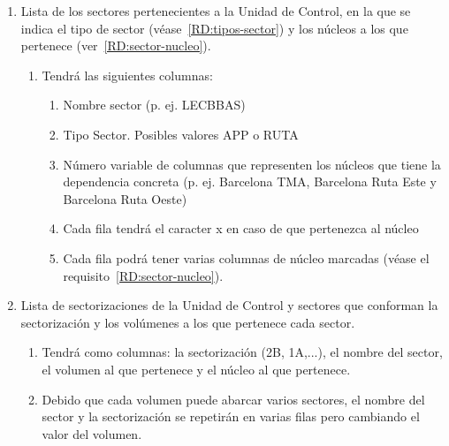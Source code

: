 \begin{enumerate}[label={\textbf{RIO\arabic*}}, ref={RIO\arabic*},  align=left]
\begin{enumerate}[label*={\textbf{.\arabic*}}]
		\item Lista de los sectores pertenecientes a la Unidad de Control, en la que se indica el tipo de sector (véase~\ref{RD:tipos-sector}) y los núcleos a los que pertenece (ver~\ref{RD:sector-nucleo}).
		\begin{enumerate}[label*={\textbf{.\arabic*}}]
			\item Tendrá las siguientes columnas: 
			\begin{enumerate}[label*={\textbf{.\arabic*}}]
				\item Nombre sector (p. ej. LECBBAS) 
				\item Tipo Sector. Posibles valores APP o RUTA
				\item Número variable de columnas que representen los núcleos que tiene la dependencia concreta (p. ej. Barcelona TMA, Barcelona Ruta Este y Barcelona Ruta Oeste)
				\item Cada fila tendrá el caracter x en caso de que pertenezca al núcleo
				\item Cada fila podrá tener varias columnas de núcleo marcadas (véase el requisito~\ref{RD:sector-nucleo}).
			\end{enumerate}
		\end{enumerate}
		\item Lista de sectorizaciones de la Unidad de Control y sectores que conforman la sectorización y los volúmenes a los que pertenece cada sector.
		\begin{enumerate}[label*={\textbf{.\arabic*}}]
			\item Tendrá como columnas: la sectorización (2B, 1A,...), el nombre del sector, el volumen al que pertenece y el núcleo al que pertenece.
			\item Debido que cada volumen puede abarcar varios sectores, el nombre del sector y la sectorización se repetirán en varias filas pero cambiando el valor del volumen.
		\end{enumerate}
	\end{enumerate}
	

\end{enumerate}
